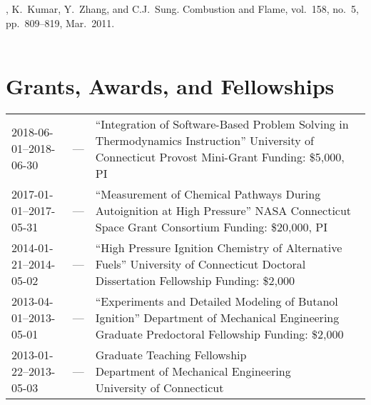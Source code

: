 \begin{bibmune}
\item {}, K.\ Kumar, Y.\ Zhang, and C.J.\ Sung.
         Combustion and Flame,
        vol.\ 158, no.\ 5, pp.\ 809--819, Mar.\ 2011.\\
        \\
\end{bibmune}

\section{{\sectionfont Grants, Awards, and Fellowships}}
\vspace{-0.32in}
\begin{center}
\begin{tabular}{lcl}
2018-06-01--2018-06-30 & --- & \makecell{``Integration of Software-Based Problem Solving in \\
Thermodynamics Instruction'' \\ University of Connecticut Provost Mini-Grant \\ Funding: \$5,000, PI} \\
2017-01-01--2017-05-31 & --- & \makecell{``Measurement of Chemical Pathways During\\Autoignition at High Pressure'' \\ NASA Connecticut Space Grant Consortium \\ Funding: \$20,000, PI} \\
2014-01-21--2014-05-02 & --- & \makecell{``High Pressure Ignition Chemistry of Alternative\\Fuels'' \\
University of Connecticut Doctoral Dissertation\\Fellowship \\
Funding: \$2,000} \\
2013-04-01--2013-05-01 & --- & \makecell{``Experiments and Detailed Modeling of Butanol\\Ignition'' \\
Department of Mechanical Engineering Graduate\\Predoctoral Fellowship \\
Funding: \$2,000} \\
2013-01-22--2013-05-03 & --- & \makecell{Graduate Teaching Fellowship \\
Department of Mechanical Engineering\\University of Connecticut} \\

\end{tabular}
\end{center}
